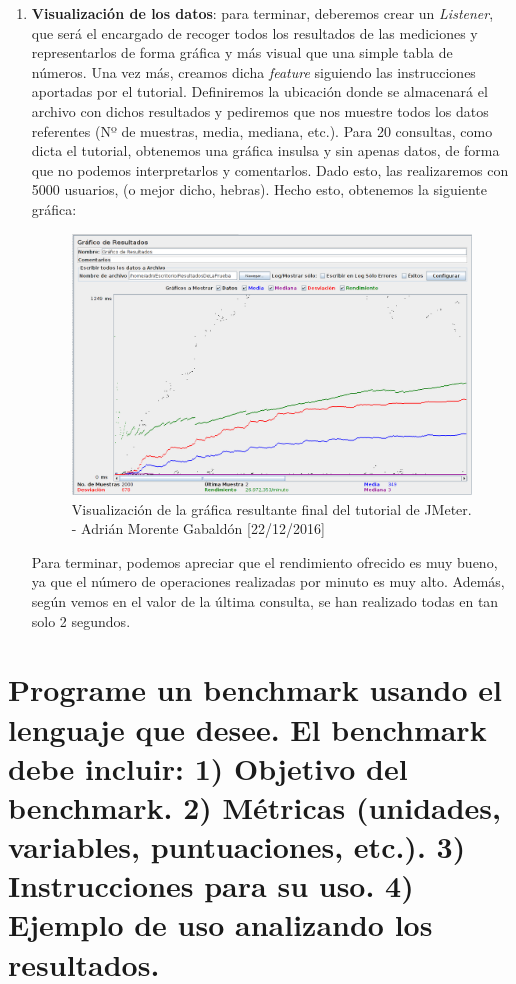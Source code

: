 \begin{enumerate}
		\item \textbf{Visualización de los datos}: para terminar, deberemos crear un \emph{Listener}, que será el encargado de recoger todos los resultados de las mediciones y representarlos de forma gráfica y más visual que una simple tabla de números. Una vez más, creamos dicha \emph{feature} siguiendo las instrucciones aportadas por el tutorial. Definiremos la ubicación donde se almacenará el archivo con dichos resultados y pediremos que nos muestre todos los datos referentes (Nº de muestras, media, mediana, etc.). Para 20 consultas, como dicta el tutorial, obtenemos una gráfica insulsa y sin apenas datos, de forma que no podemos interpretarlos y comentarlos. Dado esto, las realizaremos con 5000 usuarios, (o mejor dicho, hebras). Hecho esto, obtenemos la siguiente gráfica:
		\begin{figure}[H]
			\centering
			\includegraphics[scale=0.4]{jmeter-finalexec}
			\caption{Visualización de la gráfica resultante final del tutorial de JMeter. - Adrián Morente Gabaldón [22/12/2016]}
			\label{figura14}
		\end{figure}
		Para terminar, podemos apreciar que el rendimiento ofrecido es muy bueno, ya que el número de operaciones realizadas por minuto es muy alto. Además, según vemos en el valor de la última consulta, se han realizado todas en tan solo 2 segundos.
	\end{enumerate}


\section{Programe un benchmark usando el lenguaje que desee. El benchmark debe incluir: 1) Objetivo del benchmark. 2) Métricas (unidades, variables, puntuaciones, etc.). 3) Instrucciones para su uso. 4) Ejemplo de uso analizando los resultados.}






